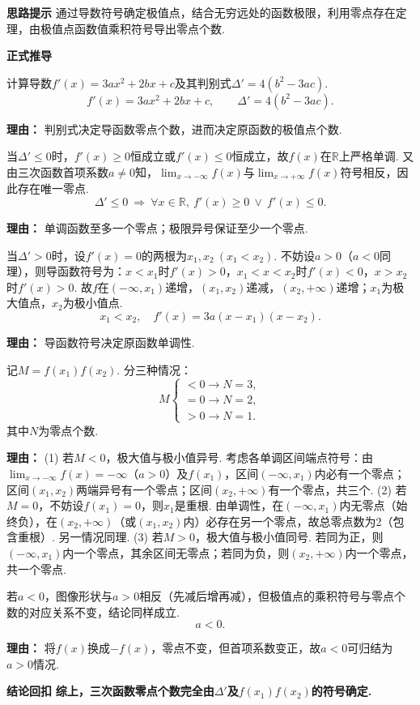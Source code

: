 \begin{proofbox}
	\textbf{\textcolor{CProof}{思路提示}}
	通过导数符号确定极值点，结合无穷远处的函数极限，利用零点存在定理，由极值点函数值乘积符号导出零点个数.

	\medskip
	\textbf{\textcolor{CProof}{正式推导}}
	\begin{description}[style=nextline, leftmargin=2.8em, labelsep=0.5em, itemsep=0.55em]
		\item[\textbf{步骤一（导数与判别式）：}]
			计算导数\(f'(x)=3ax^2+2bx+c\)及其判别式\(\Delta'=4(b^2-3ac)\).
			\[
				f'(x)=3ax^2+2bx+c,
				\qquad
				\Delta'=4(b^2-3ac).
			\]
			\par\textbf{理由：} 判别式决定导函数零点个数，进而决定原函数的极值点个数.
		\item[\textbf{步骤二（\(\Delta'\leq0\)单调唯一零点）：}]
			当\(\Delta'\leq0\)时，\(f'(x)\geq0\)恒成立或\(f'(x)\leq0\)恒成立，故\(f(x)\)在\(\mathbb{R}\)上严格单调. 又由三次函数首项系数\(a\neq0\)知，\(\lim_{x\to-\infty}f(x)\)与\(\lim_{x\to+\infty}f(x)\)符号相反，因此存在唯一零点.
			\[
				\Delta'\leq0\ \Longrightarrow\ \forall x\in\mathbb{R},\ f'(x)\geq0\ \lor\ f'(x)\leq0.
			\]
			\par\textbf{理由：} 单调函数至多一个零点；极限异号保证至少一个零点.
		\item[\textbf{步骤三（\(\Delta'>0\)极值点与单调区间）：}]
			当\(\Delta'>0\)时，设\(f'(x)=0\)的两根为\(x_1,x_2\ (x_1<x_2)\). 不妨设\(a>0\)（\(a<0\)同理），则导函数符号为：\(x<x_1\)时\(f'(x)>0\)，\(x_1<x<x_2\)时\(f'(x)<0\)，\(x>x_2\)时\(f'(x)>0\). 故\(f\)在\((-\infty,x_1)\)递增，\((x_1,x_2)\)递减，\((x_2,+\infty)\)递增；\(x_1\)为极大值点，\(x_2\)为极小值点.
			\[
				x_1<x_2,\quad f'(x)=3a(x-x_1)(x-x_2).
			\]
			\par\textbf{理由：} 导函数符号决定原函数单调性.
		\item[\textbf{步骤四（极值乘积判零点个数）：}]
			记\(M=f(x_1)f(x_2)\). 分三种情况：
			\[
				M
				\begin{cases}
					<0 \to N=3,\\ =0 \to N=2,\\ >0 \to N=1.
			\end{cases}
			\]
			其中\(N\)为零点个数.
			\par\textbf{理由：} (1) 若\(M<0\)，极大值与极小值异号. 考虑各单调区间端点符号：由\(\lim_{x\to-\infty}f(x)=-\infty\)（\(a>0\)）及\(f(x_1)\)，区间\((-\infty,x_1)\)内必有一个零点；区间\((x_1,x_2)\)两端异号有一个零点；区间\((x_2,+\infty)\)有一个零点，共三个. (2) 若\(M=0\)，不妨设\(f(x_1)=0\)，则\(x_1\)是重根. 由单调性，在\((-\infty,x_1)\)内无零点（始终负），在\((x_2,+\infty)\)（或\((x_1,x_2)\)内）必存在另一个零点，故总零点数为2（包含重根）. 另一情况同理. (3) 若\(M>0\)，极大值与极小值同号. 若同为正，则\((-\infty,x_1)\)内一个零点，其余区间无零点；若同为负，则\((x_2,+\infty)\)内一个零点，共一个零点.
		\item[\textbf{步骤五（\(a<0\)情形）：}]
			若\(a<0\)，图像形状与\(a>0\)相反（先减后增再减），但极值点的乘积符号与零点个数的对应关系不变，结论同样成立.
			\[
				a<0.
			\]
			\par\textbf{理由：} 将\(f(x)\)换成\(-f(x)\)，零点不变，但首项系数变正，故\(a<0\)可归结为\(a>0\)情况.
	\end{description}

	\medskip
	\textbf{\textcolor{CProof}{结论回扣}}
	\textbf{综上，三次函数零点个数完全由\(\Delta'\)及\(f(x_1)f(x_2)\)的符号确定.}
\end{proofbox}
